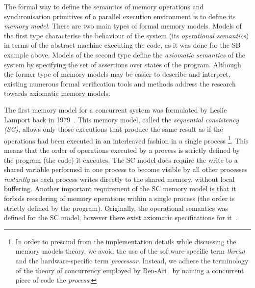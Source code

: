 The formal way to define the semantics of memory operations and synchronisation primitives of a parallel execution environment is to define its \textit{memory model}.
There are two main types of formal memory models.
Models of the first type characterise the behaviour of the system (its \textit{operational semantics}) in terms of the abstract machine executing the code, as it was done for the SB example above.
Models of the second type define the \textit{axiomatic semantics} of the system by specifying the set of assertions over states of the program.
Although the former type of memory models may be easier to describe and interpret, existing numerous formal verification tools and methods address the research towards axiomatic memory models.

The first memory model for a concurrent system was formulated by Leslie Lamport back in 1979~\cite{lamport1979make}.
This memory model, called the \textit{sequential consistency (SC)}, allows only those executions that produce the same result as if the operations had been executed in an interleaved fashion in a single process%
%
\footnote{In order to prescind from the implementation details while discussing the memory models theory, we avoid the use of the software-specific term \textit{thread} and the hardware-specific term \textit{processor}. Instead, we adhere the terminology of the theory of concurrency employed by Ben-Ari~\cite{ben2006principles} by naming a concurrent piece of code the \textit{process}.}. %
%
This means that the order of operations executed by a process is strictly defined by the program (the code) it executes.
The SC model does require the write to a shared variable performed in one process to become visible by all other processes \textit{instantly} as each process writes directly to the shared memory, without local buffering.
Another important requirement of the SC memory model is that it forbids reordering of memory operations within a single process (the order is strictly defined by the program).
Originally, the operational semantics was defined for the SC model, however there exist axiomatic specifications for it~\cite{mansky2015axiomatic}.

